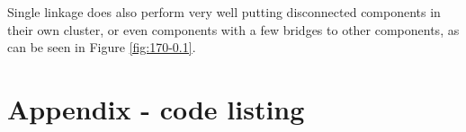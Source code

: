 \documentclass[12pt,a4paper]{article}
\begin{document}
Single linkage does also perform very well putting disconnected
components in their own cluster, or even components with a few bridges
to other components, as can be seen in Figure \ref{fig:170-0.1}.




\nocite{*}

\appendix
\section{Appendix - code listing}

\inputminted[label=main.py]{python}{../src/main.py}
\hfill
\inputminted[label=measures.py]{python}{../src/measures.py}
\hfill
\inputminted[label=clink.py]{python}{../src/link.py}
\end{document}
